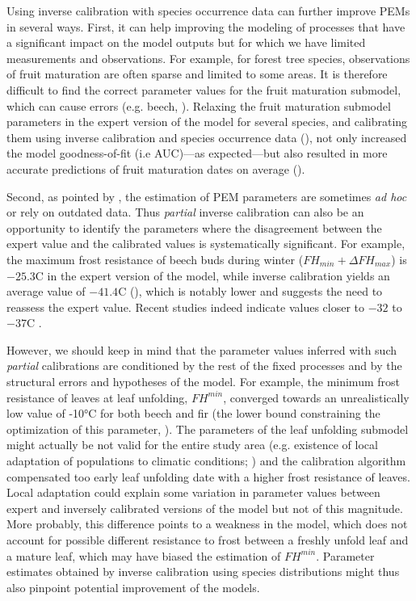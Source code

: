 \documentclass[preprint,12pt,authoryear]{elsarticle}
\begin{document}
Using inverse calibration with species occurrence data can further improve PEMs in several ways. First, it can help improving the modeling of processes that have a significant impact on the model outputs but for which we have limited measurements and observations. For example, for forest tree species, observations of fruit maturation are often sparse and limited to some areas. It is therefore difficult to find the correct parameter values for the fruit maturation submodel, which can cause errors (e.g. beech, ). Relaxing the fruit maturation submodel parameters in the expert version of the model for several species, and calibrating them using inverse calibration and species occurrence data (), not only increased the model goodness-of-fit (i.e AUC)---as expected---but also resulted in more accurate predictions of fruit maturation dates on average ().

Second, as pointed by \cite{Harrison2021}, the estimation of PEM parameters are sometimes \emph{ad hoc} or rely on outdated data. Thus \emph{partial} inverse calibration can also be an opportunity to identify the parameters where the disagreement between the expert value and the calibrated values is systematically significant. For example, the maximum frost resistance of beech buds during winter ($FH_{min}+\Delta FH_{max}$) is $-25.3$\degree C in the expert version of the model, while inverse calibration yields an average value of $-41.4$\degree C (), which is notably lower and suggests the need to reassess the expert value. Recent studies indeed indicate values closer to $-32$ to $-37$\degree C \citep{Delaporte2015, Kreyling2014, Lenz2016, Baffoin2021, CharraVaskou2012}.
 
However, we should keep in mind that the parameter values inferred with such \emph{partial} calibrations are conditioned by the rest of the fixed processes and by the structural errors and hypotheses of the model. For example, the minimum frost resistance of leaves at leaf unfolding, ${FH}^{min}$, converged towards an unrealistically low value of -10°C for both beech and fir (the lower bound constraining the optimization of this parameter, ). The parameters of the leaf unfolding submodel might actually be not valid for the entire study area (e.g. existence of local adaptation of populations to climatic conditions; \citealp{Kreyling2014, Lazic2024}) and the calibration algorithm compensated too early leaf unfolding date with a higher frost resistance of leaves. Local adaptation could explain some variation in parameter values between expert and inversely calibrated versions of the model but not of this magnitude. More probably, this difference points to a weakness in the model, which does not account for possible different resistance to frost between a freshly unfold leaf and a mature leaf, which may have biased the estimation of ${FH}^{min}$. Parameter estimates obtained by inverse calibration using species distributions might thus also pinpoint potential improvement of the models.
\end{document}
